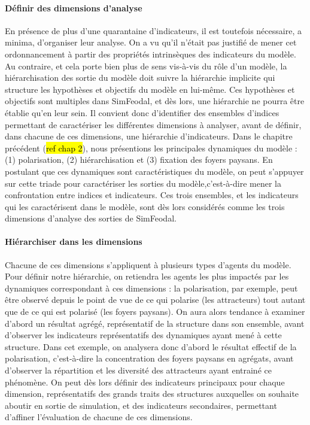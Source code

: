 \documentclass[12pt, a4paper, oneside]{book}
\begin{document}
	\paragraph{Définir des dimensions d'analyse}
	En présence de plus d'une quarantaine d'indicateurs, il est toutefois nécessaire, a minima, d'organiser leur analyse. On a vu qu'il n'était pas justifié de mener cet ordonnancement à partir des propriétés intrinsèques des indicateurs du modèle.
	Au contraire, et cela porte bien plus de sens vis-à-vis du rôle d'un modèle, la hiérarchisation des sortie du modèle doit suivre la hiérarchie implicite qui structure les hypothèses et objectifs du modèle en lui-même.
	Ces hypothèses et objectifs sont multiples dans SimFeodal, et dès lors, une hiérarchie ne pourra être établie qu'en leur sein. Il convient donc d'identifier des ensembles d'indices permettant de caractériser les différentes dimensions à analyser, avant de définir, dans chacune de ces dimensions, une hiérarchie d'indicateurs.
	Dans le chapitre précédent (\hl{ref chap 2}), nous présentions les principales dynamiques  du modèle : (1) polarisation, (2) hiérarchisation et (3) fixation des foyers paysans. En postulant que ces dynamiques sont caractéristiques du modèle, on peut s'appuyer sur cette triade pour caractériser les sorties du modèle,c'est-à-dire mener la confrontation entre indices et indicateurs. Ces trois ensembles, et les indicateurs qui les caractérisent dans le modèle, sont dès lors considérés comme les trois dimensions d'analyse des sorties de SimFeodal.
	
	\paragraph{Hiérarchiser dans les dimensions}\label{par:hierarchie_interne}
	Chacune de ces dimensions s'appliquent à plusieurs types d'agents du modèle. Pour définir notre hiérarchie, on retiendra les agents les plus impactés par les dynamiques correspondant à ces dimensions : la polarisation, par exemple, peut être observé depuis le point de vue de ce qui polarise (les attracteurs) tout autant que de ce qui est polarisé (les foyers paysans).
	On aura alors tendance à examiner d'abord un résultat agrégé, représentatif de la structure dans son ensemble, avant d'observer les indicateurs représentatifs des dynamiques ayant mené à cette structure.
	Dans cet exemple, on analysera donc d'abord le résultat effectif de la polarisation, c'est-à-dire la concentration des foyers paysans en agrégats, avant d'observer la répartition et les diversité des attracteurs ayant entrainé ce phénomène. On peut dès lors définir des \og indicateurs principaux\fg{} pour chaque dimension, représentatifs des grands traits des structures auxquelles on souhaite aboutir en sortie de simulation, et des \og indicateurs secondaires\fg{}, permettant d'affiner l'évaluation de chacune de ces dimensions.
	
\end{document}
